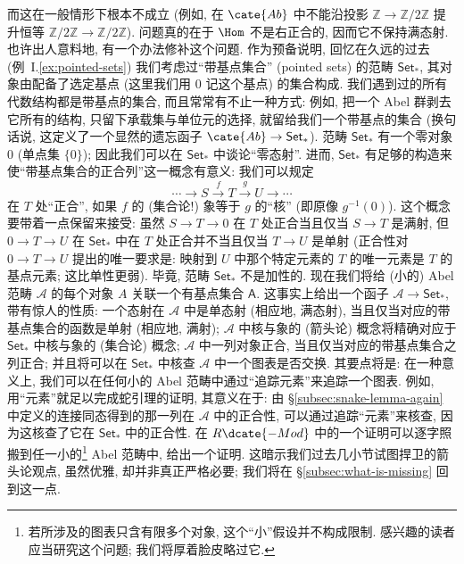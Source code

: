 \begin{center}
\end{center}
而这在一般情形下根本不成立 (例如, 在 $\cate{Ab}$ 中不能沿投影 $\mathbb{Z}\to\mathbb{Z}/2\mathbb{Z}$ 提升恒等 $\mathbb{Z}/2\mathbb{Z}\to\mathbb{Z}/2\mathbb{Z}$). 问题真的在于 $\Hom$ 不是右正合的, 因而它不保持满态射.
也许出人意料地, 有一个办法修补这个问题.
\indent 作为预备说明, 回忆在久远的过去 (例~I.\ref{ex:pointed-sets}) 我们考虑过``带基点集合'' (pointed sets) 的范畴 $\mathsf{Set}_*$, 其对象由配备了选定基点 (这里我们用 $0$ 记这个基点) 的集合构成. 我们遇到过的所有代数结构都是带基点的集合, 而且常常有不止一种方式: 例如, 把一个 Abel 群剥去它所有的结构, 只留下承载集与单位元的选择, 就留给我们一个带基点的集合 (换句话说, 这定义了一个显然的遗忘函子 $\cate{Ab}\to\mathsf{Set}_*$). 范畴 $\mathsf{Set}_*$ 有一个零对象 $0$ (单点集 $\{0\}$); 因此我们可以在 $\mathsf{Set}_*$ 中谈论``零态射''. 进而, $\mathsf{Set}_*$ 有足够的构造来使``带基点集合的正合列''这一概念有意义: 我们可以规定
\[
\cdots\longrightarrow S\xrightarrow{f}T\xrightarrow{g}U\longrightarrow\cdots
\]
在 $T$ 处``正合'', 如果 $f$ 的 (集合论!) 象等于 $g$ 的``核'' (即原像 $g^{-1}(0)$). 这个概念要带着一点保留来接受: 虽然 $S\to T\to 0$ 在 $T$ 处正合当且仅当 $S\to T$ 是满射, 但 $0\to T\to U$ 在 $\mathsf{Set}_*$ 中在 $T$ 处正合并不当且仅当 $T\to U$ 是单射 (正合性对 $0\to T\to U$ 提出的唯一要求是: 映射到 $U$ 中那个特定元素的 $T$ 的唯一元素是 $T$ 的基点元素; 这比单性更弱). 毕竟, 范畴 $\mathsf{Set}_*$ 不是加性的.
现在我们将给 (小的) Abel 范畴 $\mathcal{A}$ 的每个对象 $A$ 关联一个有基点集合 $\mathsf{A}$. 这事实上给出一个函子 $\mathcal{A}\to\mathsf{Set}_*$, 带有惊人的性质: 一个态射在 $\mathcal{A}$ 中是单态射 (相应地, 满态射), 当且仅当对应的带基点集合的函数是单射 (相应地, 满射); $\mathcal{A}$ 中核与象的 (箭头论) 概念将精确对应于 $\mathsf{Set}_*$ 中核与象的 (集合论) 概念; $\mathcal{A}$ 中一列对象正合, 当且仅当对应的带基点集合之列正合; 并且将可以在 $\mathsf{Set}_*$ 中核查 $\mathcal{A}$ 中一个图表是否交换.
其要点将是: 在一种意义上, 我们可以在任何小的 Abel 范畴中通过``追踪元素''来追踪一个图表. 例如, 用``元素''就足以完成蛇引理的证明, 其意义在于: 由 \S\ref{subsec:snake-lemma-again} 中定义的连接同态得到的那一列在 $\mathcal{A}$ 中的正合性, 可以通过追踪``元素''来核查, 因为这核查了它在 $\mathsf{Set}_*$ 中的正合性. 在 $R\dcate{-Mod}$ 中的一个证明可以逐字照搬到任一小的\footnote{若所涉及的图表只含有限多个对象, 这个``小''假设并不构成限制. 感兴趣的读者应当研究这个问题; 我们将厚着脸皮略过它.} Abel 范畴中, 给出一个证明. 这暗示我们过去几小节试图捍卫的箭头论观点, 虽然优雅, 却并非真正严格必要; 我们将在 \S\ref{subsec:what-is-missing} 回到这一点.
